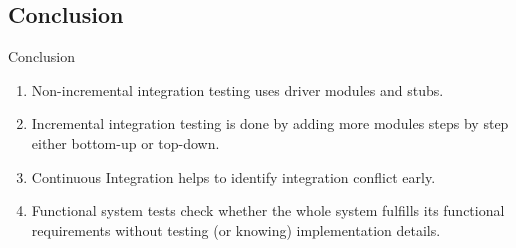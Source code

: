 \subsection*{Conclusion}

\begin{frame}{Conclusion}
  \begin{enumerate}
    \item \alert{Non-incremental} integration testing uses \alert{driver modules} and \alert{stubs}.
    \item \alert{Incremental} integration testing is done by adding more modules \alert{steps by step} either \alert{bottom-up} or \alert{top-down}.
    \item \alert{Continuous Integration} helps to identify integration conflict early.
    \item Functional \alert{system tests} check whether the \alert{whole system} fulfills its functional requirements \alert{without testing} (or knowing) \alert{implementation details}.
  \end{enumerate}
\end{frame}